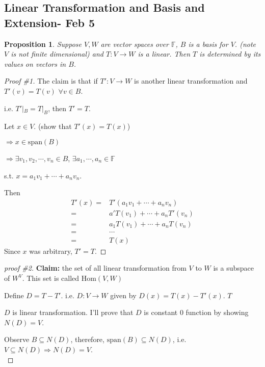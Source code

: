\documentclass[12pt]{article}
\theoremstyle{plain}
\newtheorem{proposition}{Proposition}[subsection]
\newcommand{\Span}{\mathrm{span}}
\newcommand{\Hom}{\mathrm{Hom}}
\newcommand{\mF}{{\mathbb{F}}}
\begin{document}
	\subsection{Linear Transformation and Basis and Extension- Feb 5}
	\begin{proposition}
		Suppose $V, W$ are vector spaces over $\mF$, $B$ is a basis for $V$. 
		(note $V$ is not finite dimensional) and $T: V\to W$ is a linear.		
		Then $T$ is determined by its values on vectors in $B$. 
	\end{proposition}
	\begin{proof}[Proof \#1]
		The claim is that if $T': V\to W$ is another linear transformation
		and $T'(v) = T(v)$ $\forall v\in B$.

		i.e. $T'|_{B} = T|_B$, then $T' = T$. 

		Let $x \in V$. (show that $T'(x) = T(x)$) 
		\begin{description}
			\item $\Rightarrow x \in \Span(B)$
			\item $\Rightarrow \exists v_1, v_2,\cdots, v_n \in B$, 
				$\exists a_1,\cdots,a_n \in \mF$
		\end{description}
		s.t. $x = a_1v_1+\cdots+a_nv_n$. 
		
		Then 
		\begin{align*}	
			T'(x) 
			=& T'(a_1v_1+\cdots + a_nv_n) \\
			=& a'T(v_1)+\cdots+a_nT'(v_n) \\
			=& a_1T(v_1) + \cdots + a_nT(v_n)\\
			=& \cdots \\
			=& T(x) 
		\end{align*}
		Since $x$ was arbitrary, $T' = T$. 
	\end{proof}
	\begin{proof}[proof \#2]
		\textbf{Claim:} the set of all linear transformation from $V$ to $W$ 
		is a subspace of $W^V$. This set is called $\Hom(V,W)$

		Define $D = T-T'$.
		i.e. $D : V \to W$ given by $D(x) = T(x) - T'(x)$. $T$

		$D$ is linear transformation. I'll prove that $D$ is constant $0$
		function by showing $N(D) = V$. 

		Observe $B \subseteq N(D)$, therefore, $\Span(B) \subseteq N(D)$, 
		i.e. $V \subseteq N(D) \Rightarrow N(D) = V$.\\
	\end{proof}
\end{document}

